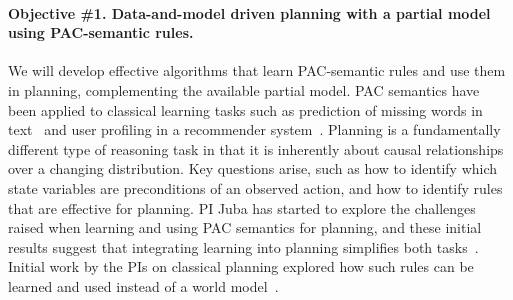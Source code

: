 \documentclass[12pt]{article}
\begin{document}
\vspace{-0.35cm}

\paragraph{Objective \#1. Data-and-model driven planning with a partial model using PAC-semantic rules.}
We will develop effective algorithms that learn PAC-semantic rules 
and use them in planning, complementing the available partial model. %
PAC semantics have been applied to classical learning tasks such as prediction of missing words in text~\cite{michael2008first} and user profiling in a recommender system~\cite{semeraro2009knowledge}. Planning is a fundamentally different type of reasoning task in that it is inherently about causal relationships over a changing distribution. Key questions arise, such as how to identify which state variables are preconditions of an observed action, and how to identify rules that are effective for planning. %
PI Juba has started to explore the challenges raised when learning and using PAC semantics for planning, and these initial results suggest that integrating learning into planning simplifies both tasks~\cite{juba2016jmlr}. Initial work by the PIs on classical planning explored how such rules can be learned and used instead of a world model~\cite{stern2017efficientAndSafe}. 

\end{document}
